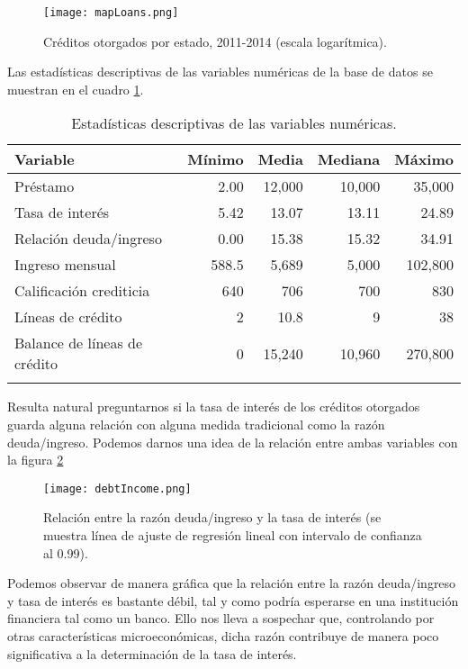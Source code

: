 \documentclass[12pt, fleqn, letterpaper, oneside]{amsart}
\begin{document}
\begin{figure}[h!]
	\texttt{[image: mapLoans.png]}
	\caption{Créditos otorgados por estado, 2011-2014 (escala logarítmica). \label{map}}
\end{figure}

Las estadísticas descriptivas de las variables numéricas de la base de datos se muestran en el cuadro \ref{desc}.

\begin{table}[h!]
	\begin{tabular}{l r r r r}
		\toprule
		Variable  &  Mínimo  &  Media  &  Mediana  &  Máximo \\
		\midrule
		Préstamo & 2.00 & 12,000 & 10,000 & 35,000 \\ 
		Tasa de interés & 5.42 & 13.07 & 13.11 & 24.89 \\
		Relación deuda/ingreso & 0.00 & 15.38 & 15.32 & 34.91 \\
		Ingreso mensual & 588.5 & 5,689 & 5,000 & 102,800 \\
		Calificación crediticia & 640 & 706 & 700 & 830 \\ 
		Líneas de crédito & 2 & 10.8 & 9 & 38 \\
		Balance de líneas de crédito & 0 & 15,240 & 10,960 & 270,800\\
		\bottomrule
		 & & & & 
	\end{tabular}
	\caption{Estadísticas descriptivas de las variables numéricas.\label{desc}}
\end{table}

Resulta natural preguntarnos si la tasa de interés de los créditos otorgados guarda alguna relación con alguna medida tradicional como la razón deuda/ingreso. Podemos darnos una idea de la relación entre ambas variables con la figura \ref{debt-graph}

\begin{figure}[h!]
	\texttt{[image: debtIncome.png]}
	\caption{Relación entre la razón deuda/ingreso y la tasa de interés (se muestra línea de ajuste de regresión lineal con intervalo de confianza al 0.99). \label{debt-graph}}
\end{figure}

Podemos observar de manera gráfica que la relación entre la razón deuda/ingreso y tasa de interés es bastante débil, tal y como podría esperarse en una institución financiera tal como un banco. Ello nos lleva a sospechar que, controlando por otras características microeconómicas,  dicha razón contribuye de manera poco significativa a la determinación de la tasa de interés. 
\end{document}
